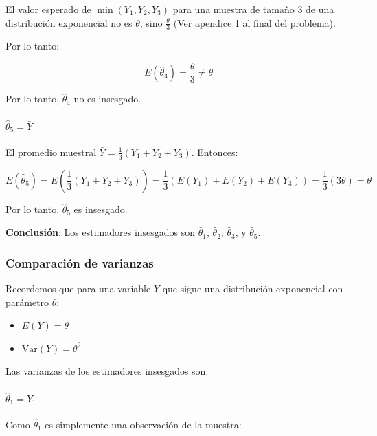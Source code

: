 \documentclass[
]{article}
\providecommand{\tightlist}{%
  \setlength{\itemsep}{0pt}\setlength{\parskip}{0pt}}
\begin{document}
El valor esperado de \(\min(Y_1, Y_2, Y_3)\) para una muestra de tamaño 3 de una distribución exponencial no es \(\theta\), sino \(\frac{\theta}{3}\) (Ver apendice 1 al final del problema).

Por lo tanto:

\[
E(\hat{\theta}_4) = \frac{\theta}{3} \neq \theta
\]

Por lo tanto, \(\hat{\theta}_4\) no es insesgado.

\paragraph{\texorpdfstring{\(\hat{\theta}_5 = \bar{Y}\)}{\textbackslash hat\{\textbackslash theta\}\_5 = \textbackslash bar\{Y\}}}\label{hattheta_5-bary}

El promedio muestral \(\bar{Y} = \frac{1}{3}(Y_1 + Y_2 + Y_3)\). Entonces:

\[
E(\hat{\theta}_5) = E\left(\frac{1}{3}(Y_1 + Y_2 + Y_3)\right) = \frac{1}{3}(E(Y_1) + E(Y_2) + E(Y_3)) = \frac{1}{3}(3\theta) = \theta
\]

Por lo tanto, \(\hat{\theta}_5\) es insesgado.

\textbf{Conclusión}: Los estimadores insesgados son \(\hat{\theta}_1\), \(\hat{\theta}_2\), \(\hat{\theta}_3\), y \(\hat{\theta}_5\).

\subsubsection{Comparación de varianzas}\label{comparaciuxf3n-de-varianzas}

Recordemos que para una variable \(Y\) que sigue una distribución exponencial con parámetro \(\theta\):

\begin{itemize}
\tightlist
\item
  \(E(Y) = \theta\)
\item
  \(\text{Var}(Y) = \theta^2\)
\end{itemize}

Las varianzas de los estimadores insesgados son:

\paragraph{\texorpdfstring{\(\hat{\theta}_1 = Y_1\)}{\textbackslash hat\{\textbackslash theta\}\_1 = Y\_1}}\label{hattheta_1-y_1-1}

Como \(\hat{\theta}_1\) es simplemente una observación de la muestra:
\end{document}
